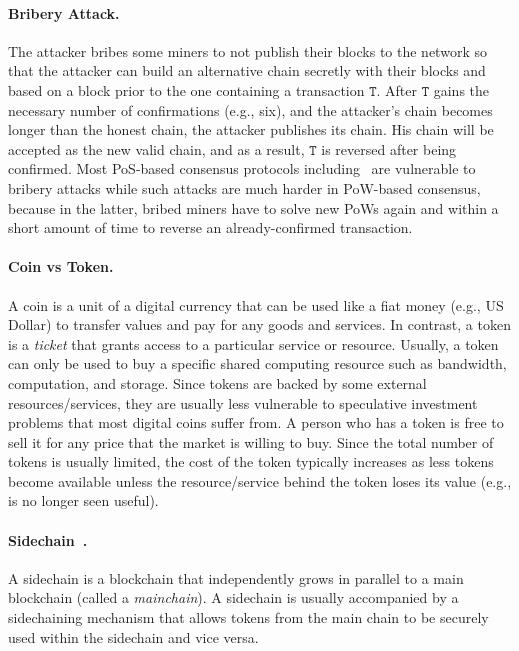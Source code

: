 \documentclass[11pt]{article}
\theoremstyle{mytheoremstyle}
\begin{document}
\paragraph{Bribery Attack.} The attacker bribes some miners to not publish their blocks to the network so that the attacker can build an alternative chain secretly with their blocks and based on a block prior to the one containing a transaction $\mathtt{T}$. After $\mathtt{T}$ gains the necessary number of confirmations (e.g., six), and the attacker's chain becomes longer than the honest chain, the attacker publishes its chain. His chain will be accepted as the new valid chain, and as a result, $\mathtt{T}$ is reversed after being confirmed. Most PoS-based consensus protocols including~\cite{cryptoeprint:2016:889,algorand16} are vulnerable to bribery attacks while such attacks are much harder in PoW-based consensus, because in the latter, bribed miners have to solve new PoWs again and within a short amount of time to reverse an already-confirmed transaction.

\paragraph{Coin vs Token.} A coin is a unit of a digital currency that can be used like a fiat money (e.g., US Dollar) to transfer values and pay for any goods and services. In contrast, a token is a \emph{ticket} that grants access to a particular service or resource. Usually, a token can only be used to buy a specific shared computing resource such as bandwidth, computation, and storage. Since tokens are backed by some external resources/services, they are usually less vulnerable to speculative investment problems that most digital coins suffer from. A person who has a token is free to sell it for any price that the market is willing to buy. Since the total number of tokens is usually limited, the cost of the token typically increases as less tokens become available unless the resource/service behind the token loses its value (e.g., is no longer seen useful).

\paragraph{Sidechain~\cite{sidechains:2014}.} A sidechain is a blockchain that independently grows in parallel to a main blockchain (called a \emph{mainchain}). A sidechain is usually accompanied by a sidechaining mechanism that allows tokens from the main chain to be securely used within the sidechain and vice versa.
\end{document}
